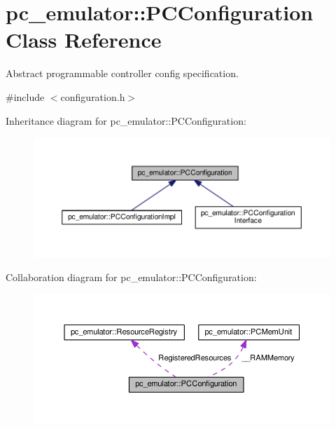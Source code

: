 \hypertarget{classpc__emulator_1_1PCConfiguration}{}\section{pc\+\_\+emulator\+:\+:P\+C\+Configuration Class Reference}
\label{classpc__emulator_1_1PCConfiguration}


Abstract programmable controller config specification.  




{\ttfamily \#include $<$configuration.\+h$>$}



Inheritance diagram for pc\+\_\+emulator\+:\+:P\+C\+Configuration\+:
\nopagebreak
\begin{figure}[H]
\begin{center}
\leavevmode
\includegraphics[width=350pt]{classpc__emulator_1_1PCConfiguration__inherit__graph}
\end{center}
\end{figure}


Collaboration diagram for pc\+\_\+emulator\+:\+:P\+C\+Configuration\+:\nopagebreak
\begin{figure}[H]
\begin{center}
\leavevmode
\includegraphics[width=350pt]{classpc__emulator_1_1PCConfiguration__coll__graph}
\end{center}
\end{figure}
